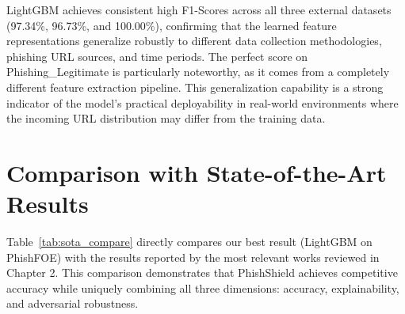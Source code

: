 LightGBM achieves consistent high F1-Scores across all three external datasets (97.34\%, 96.73\%, and 100.00\%), confirming that the learned feature representations generalize robustly to different data collection methodologies, phishing URL sources, and time periods. The perfect score on Phishing\_Legitimate is particularly noteworthy, as it comes from a completely different feature extraction pipeline. This generalization capability is a strong indicator of the model's practical deployability in real-world environments where the incoming URL distribution may differ from the training data.

\section{Comparison with State-of-the-Art Results}

Table~\ref{tab:sota_compare} directly compares our best result (LightGBM on PhishFOE) with the results reported by the most relevant works reviewed in Chapter 2. This comparison demonstrates that PhishShield achieves competitive accuracy while uniquely combining all three dimensions: accuracy, explainability, and adversarial robustness.

\begin{table}[H]
    \caption{Comparison of PhishShield results with state-of-the-art phishing detection works}
    \label{tab:sota_compare}
    \vspace{6pt}
    \centering
\end{table}

